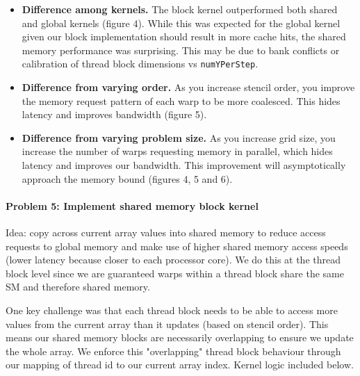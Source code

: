 \documentclass[12pt,letterpaper,twoside]{article}
\begin{document}
\begin{itemize}
    \item \textbf{Difference among kernels. } The block kernel outperformed both shared 
    and global kernels (figure 4). While this was expected for the global kernel given our block 
    implementation should result in more cache hits, the shared memory performance was 
    surprising. This may be due to bank conflicts or calibration of thread block 
    dimensions vs \texttt{numYPerStep}.

    \item \textbf{Difference from varying order. } As you increase stencil order, 
    you improve the memory request pattern of each warp to be more coalesced.
    This hides latency and improves bandwidth (figure 5).

    \item \textbf{Difference from varying problem size. } As you increase grid size, 
    you increase the number of warps requesting memory in parallel, which hides 
    latency and improves our bandwidth. This improvement will asymptotically 
    approach the memory bound (figures 4, 5 and 6).

\end{itemize}


\paragraph{Problem 5: Implement shared memory block kernel } Idea: copy across current 
array values into shared memory to reduce access requests to global memory and make use 
of higher shared memory access speeds (lower latency because closer to each processor 
core). We do this at the thread block level since we are guaranteed warps within a 
thread block share the same SM and therefore shared memory. 

One key challenge was that each thread block needs to be able to access more values from 
the current array than it updates (based on stencil order). This means our shared memory 
blocks are necessarily overlapping to ensure we update the whole array. We enforce this 
"overlapping" thread block behaviour through our mapping of thread id to our current 
array index. Kernel logic included below.
\end{document}

